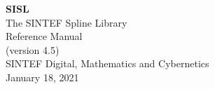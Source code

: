 \documentclass[a4paper]{report}
\begin{document}
\begin{titlepage}
  \vspace{5 cm}
  \begin{center}
  \Huge
  \textbf{SISL} \\
  \huge
  The SINTEF Spline Library \\ 
  \LARGE
  Reference Manual \\
  (version 4.5)\\ 
  \vspace{10 mm}
  \large
  SINTEF Digital, Mathematics and Cybernetics \\
  January 18, 2021
  \end{center}

\end{titlepage}

\tableofcontents
\cleardoublepage
{}
\setcounter{page}{1}

\cleardoublepage

\cleardoublepage

\cleardoublepage

\cleardoublepage

\cleardoublepage

\cleardoublepage

\cleardoublepage

\cleardoublepage

\cleardoublepage

\cleardoublepage

\cleardoublepage
\printindex
\end{document}
